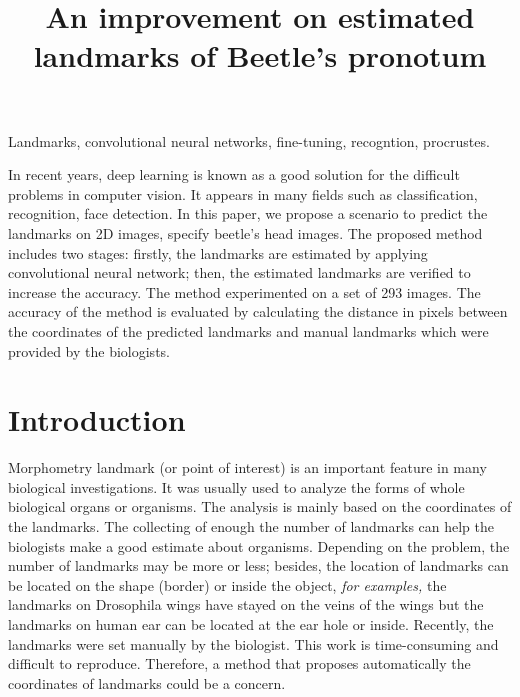 \documentclass[10pt]{article}
\begin{document}
\noindent



\title{An improvement on estimated landmarks of Beetle's pronotum}




\maketitle

\keywords
Landmarks, convolutional neural networks, fine-tuning, recogntion, procrustes.

\abstract
In recent years, deep learning is known as a good solution for the difficult problems in computer vision. It appears in many fields such as classification, recognition, face detection. In this paper, we propose a scenario to predict the landmarks on 2D images, specify beetle's head images. The proposed method includes two stages: firstly, the landmarks are estimated by applying convolutional neural network; then, the estimated landmarks are verified to increase the accuracy. The method experimented on a set of 293 images. The accuracy of the method is evaluated by calculating the distance in pixels between the coordinates of the predicted landmarks and manual landmarks which were provided by the biologists.

\section{Introduction}
Morphometry landmark (or point of interest) is an important feature in many biological investigations. It was usually used to analyze the forms of whole biological organs or organisms. The analysis is mainly based on the coordinates of the landmarks. The collecting of enough the number of landmarks can help the biologists make a good estimate about organisms. Depending on the problem, the number of landmarks may be more or less; besides, the location of landmarks can be located on the shape (border) or inside the object, \textit{for examples,} the landmarks on Drosophila wings have stayed on the veins of the wings but the landmarks on human ear can be located at the ear hole or inside. Recently, the landmarks were set manually by the biologist. This work is time-consuming and difficult to reproduce. Therefore, a method that proposes automatically the coordinates of landmarks could be a concern. 
\end{document}
